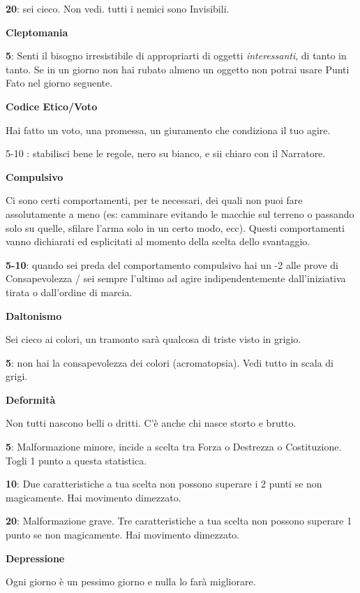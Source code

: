 \documentclass[a4paper,twoside,openany]{book}
\begin{document}
\begin{multicols}{2}
\textbf{20}: sei cieco. Non vedi. tutti i nemici sono Invisibili.

\textbf{Cleptomania}

\textbf{5}: Senti il bisogno irresistibile di appropriarti di oggetti \emph{interessanti}, di tanto in tanto. Se in un giorno non hai rubato almeno un oggetto non potrai usare Punti Fato nel giorno seguente.

\textbf{Codice Etico/Voto}

Hai fatto un voto, una promessa, un giuramento che condiziona il tuo agire.

5-10 : stabilisci bene le regole, nero su bianco, e sii chiaro con il Narratore.

\textbf{Compulsivo}

Ci sono certi comportamenti, per te necessari, dei quali non puoi fare assolutamente a meno (es: camminare evitando le macchie sul terreno o passando solo su quelle, sfilare l'arma solo in un certo modo, ecc).
Questi comportamenti vanno dichiarati ed esplicitati al momento della scelta dello svantaggio.

\textbf{5-10}: quando sei preda del comportamento compulsivo hai un -2 alle prove di Consapevolezza / sei sempre l'ultimo ad agire indipendentemente dall'iniziativa tirata o dall'ordine di marcia.

\textbf{Daltonismo}

Sei cieco ai colori, un tramonto sarà qualcosa di triste visto in grigio.

\textbf{5}: non hai la consapevolezza dei colori (acromatopsia). Vedi tutto in scala di grigi.

\textbf{Deformità}

Non tutti nascono belli o dritti. C'è anche chi nasce storto e brutto.

\textbf{5}: Malformazione minore, incide a scelta tra Forza o Destrezza o Costituzione. Togli 1 punto a questa statistica.

\textbf{10}: Due caratteristiche a tua scelta non possono superare i 2 punti se non magicamente. Hai movimento dimezzato.

\textbf{20}: Malformazione grave. Tre caratteristiche a tua scelta non possono superare 1 punto se non magicamente. Hai movimento dimezzato.

\textbf{Depressione}

Ogni giorno è un pessimo giorno e nulla lo farà migliorare.


\end{multicols}
\end{document}

